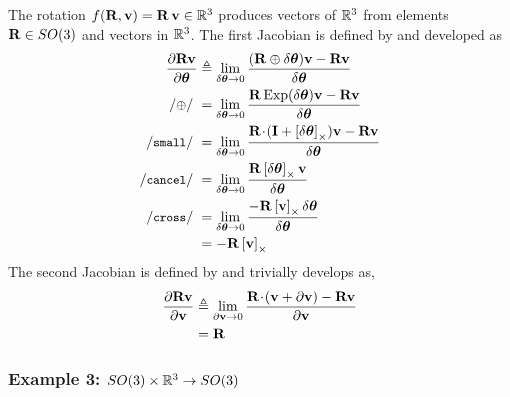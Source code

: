 The rotation $f({\bf R},{\bf v}) = {\bf R}\,{\bf v} \in {\mathbb R}^3$ produces vectors of ${\mathbb R}^3$ from elements ${\bf R}\in SO(3)$ and vectors in ${\mathbb R}^3$. The first Jacobian is defined by  and developed as
%
\begin{align*}
\dpar{\bfR\bfv}{\bth} 
&\te \lim_{\delta\bth\to0}\frac{(\bfR\oplus\delta\bth)\bfv-\bfR\bfv}{\delta\bth} \\
\com{$\oplus$}
&= \lim_{\delta\bth\to0}\frac{\bfR\Exp(\delta\bth)\bfv-\bfR\bfv}{\delta\bth} \\
\csmall
&= \lim_{\delta\bth\to0}\frac{\bfR\tdot(\bfI+\hatx{\delta\bth})\bfv-\bfR\bfv}{\delta\bth} \\
\ccancel
&= \lim_{\delta\bth\to0}\frac{\bfR\hatx{\delta\bth}\bfv}{\delta\bth} \\
\ccross
&= \lim_{\delta\bth\to0}\frac{-\bfR\hatx{\bfv}\delta\bth}{\delta\bth} \\
&= -\bfR\hatx{\bfv} 
\end{align*}
%
The second Jacobian is defined by  and trivially develops as,
%
\begin{align*}
\frac{\partial{\bf R}{\bf v}}{\partial{\bf v}} 
&\triangleq \lim_{\partial{\bf v}\to0}\frac{{\bf R}\!\cdot\!({\bf v}+\partial{\bf v})-{\bf R}{\bf v}}{\partial{\bf v}} \\
&= {\bf R}
\end{align*}

\subsubsection{Example 3: $SO(3)\times{\mathbb R}^3\to SO(3)$} 

